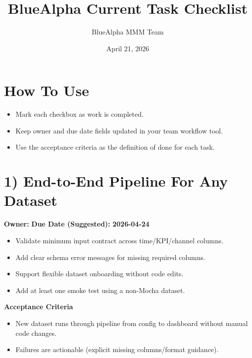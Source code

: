 \documentclass[11pt]{article}
\title{BlueAlpha Current Task Checklist}
\author{BlueAlpha MMM Team}
\date{April 21, 2026}
\begin{document}
\maketitle

\section*{How To Use}
\begin{itemize}
  \item Mark each checkbox as work is completed.
  \item Keep owner and due date fields updated in your team workflow tool.
  \item Use the acceptance criteria as the definition of done for each task.
\end{itemize}

\section*{1) End-to-End Pipeline For Any Dataset}
\textbf{Owner:} \underline{\hspace{2.0in}} \textbf{Due Date (Suggested):} \textbf{2026-04-24}
\vspace{0.15in}
\begin{itemize}
  \item[$\square$] Validate minimum input contract across time/KPI/channel columns.
  \item[$\square$] Add clear schema error messages for missing required columns.
  \item[$\square$] Support flexible dataset onboarding without code edits.
  \item[$\square$] Add at least one smoke test using a non-Mocha dataset.
\end{itemize}
\textbf{Acceptance Criteria}
\begin{itemize}
  \item[$\square$] New dataset runs through pipeline from config to dashboard without manual code changes.
  \item[$\square$] Failures are actionable (explicit missing columns/format guidance).
\end{itemize}
\end{document}
